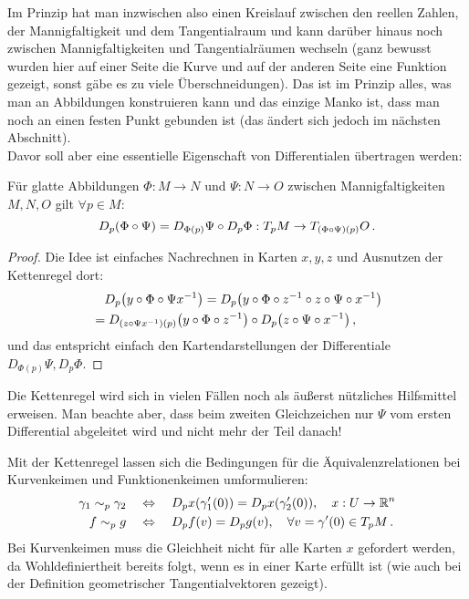 \documentclass[../H_Analysis_main.tex]{subfiles}
\begin{document}
Im Prinzip hat man inzwischen also einen Kreislauf zwischen den reellen Zahlen, der Mannigfaltigkeit und dem Tangentialraum und kann darüber hinaus noch zwischen Mannigfaltigkeiten und Tangentialräumen wechseln (ganz bewusst wurden hier auf einer Seite die Kurve und auf der anderen Seite eine Funktion gezeigt, sonst gäbe es zu viele Überschneidungen). Das ist im Prinzip alles, was man an Abbildungen konstruieren kann und das einzige Manko ist, dass man noch an einen festen Punkt gebunden ist (das ändert sich jedoch im nächsten Abschnitt).\\


Davor soll aber eine essentielle Eigenschaft von Differentialen übertragen werden:
\begin{satz}[Kettenregel]
Für glatte Abbildungen $\Phi: M \rightarrow N$ und $\Psi: N \rightarrow O$ zwischen Mannigfaltigkeiten $M, N, O$ gilt $\forall p \in M$:
\begin{equation}
D_p \qty(\Phi \circ \Psi) = D_{\Phi(p)} \Psi \circ D_p \Phi: T_p M \rightarrow T_{\qty(\Phi \circ \Psi)(p)} O \, .
\end{equation}
\end{satz}
\begin{proof}
Die Idee ist einfaches Nachrechnen in Karten $x, y, z$ und Ausnutzen der Kettenregel dort:
\begin{align*}
&\quad D_p \qty(y \circ \Phi \circ \Psi x^{-1}) = D_p \qty(y \circ \Phi \circ z^{-1} \circ z \circ \Psi \circ x^{-1})
\\
&= D_{\qty(z \circ \Psi x^{-1})(p)} \qty(y \circ \Phi \circ z^{-1}) \circ D_p \qty(z \circ \Psi \circ x^{-1}) \, ,
\end{align*}
und das entspricht einfach den Kartendarstellungen der Differentiale $D_{\Phi(p)} \Psi, D_p \Phi$.
\end{proof}
Die Kettenregel wird sich in vielen Fällen noch als äußerst nützliches Hilfsmittel erweisen. Man beachte aber, dass beim zweiten Gleichzeichen nur $\Psi$ vom ersten Differential abgeleitet wird und nicht mehr der Teil danach!

\begin{bsp}
Mit der Kettenregel lassen sich die Bedingungen für die Äquivalenzrelationen bei Kurvenkeimen und Funktionenkeimen umformulieren:
\begin{align}
\gamma_1 \sim_p \gamma_2 \quad &\Leftrightarrow \quad D_p x\qty(\gamma_1'(0)) = D_p x\qty(\gamma_2'(0)), \quad x: U \rightarrow \mathbb{R}^n
\\
f \sim_p g \quad &\Leftrightarrow \quad D_p f(v) = D_p g(v), \quad \forall v = \gamma'(0) \in T_p M \, .
\end{align}
Bei Kurvenkeimen muss die Gleichheit nicht für alle Karten $x$ gefordert werden, da Wohldefiniertheit bereits folgt, wenn es in einer Karte erfüllt ist (wie auch bei der Definition geometrischer Tangentialvektoren gezeigt).
\end{bsp}
\end{document}
